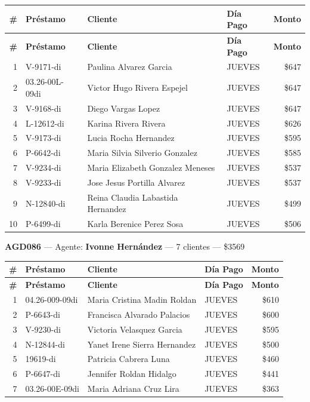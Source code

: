 \documentclass[11pt,a4paper]{article}
\newcommand{\money}[1]{\$\num{#1}}
\begin{document}
\begin{center}
\renewcommand{\arraystretch}{1.1}
\footnotesize
\begin{longtable}{rlp{6.5cm}lr}
\toprule
\textbf{\#} & \textbf{Pr\'estamo} & \textbf{Cliente} & \textbf{D\'ia Pago} & \textbf{Monto} \\
\midrule
\endfirsthead
\toprule
\textbf{\#} & \textbf{Pr\'estamo} & \textbf{Cliente} & \textbf{D\'ia Pago} & \textbf{Monto} \\
\midrule
\endhead
1 & V-9171-di & Paulina Alvarez Garcia & JUEVES & \money{647} \\
2 & 03.26-00L-09di & Victor Hugo Rivera Espejel & JUEVES & \money{647} \\
3 & V-9168-di & Diego Vargas Lopez & JUEVES & \money{647} \\
4 & L-12612-di & Karina Rivera Rivera & JUEVES & \money{626} \\
5 & V-9173-di & Lucia Rocha Hernandez & JUEVES & \money{595} \\
6 & P-6642-di & Maria Silvia Silverio Gonzalez & JUEVES & \money{585} \\
7 & V-9234-di & Maria Elizabeth Gonzalez Meneses & JUEVES & \money{537} \\
8 & V-9233-di & Jose Jesus Portilla Alvarez & JUEVES & \money{537} \\
9 & N-12840-di & Reina Claudia Labastida Hernandez & JUEVES & \money{499} \\
10 & P-6499-di & Karla Berenice Perez Sosa & JUEVES & \money{506} \\

\bottomrule
\end{longtable}
\end{center}
\noindent\textbf{AGD086} --- Agente: \textbf{Ivonne Hernández} --- 7 clientes --- \money{3569}


\begin{center}
\renewcommand{\arraystretch}{1.1}
\footnotesize
\begin{longtable}{rlp{6.5cm}lr}
\toprule
\textbf{\#} & \textbf{Pr\'estamo} & \textbf{Cliente} & \textbf{D\'ia Pago} & \textbf{Monto} \\
\midrule
\endfirsthead
\toprule
\textbf{\#} & \textbf{Pr\'estamo} & \textbf{Cliente} & \textbf{D\'ia Pago} & \textbf{Monto} \\
\midrule
\endhead
1 & 04.26-009-09di & Maria Cristina Madin Roldan & JUEVES & \money{610} \\
2 & P-6643-di & Francisca Alvarado Palacios & JUEVES & \money{600} \\
3 & V-9230-di & Victoria Velasquez Garcia & JUEVES & \money{595} \\
4 & N-12844-di & Yanet Irene Sierra Hernandez & JUEVES & \money{500} \\
5 & 19619-di & Patricia Cabrera Luna & JUEVES & \money{460} \\
6 & P-6647-di & Jennifer Roldan Hidalgo & JUEVES & \money{441} \\
7 & 03.26-00E-09di & Maria Adriana Cruz Lira & JUEVES & \money{363} \\

\bottomrule
\end{longtable}
\end{center}
\end{document}
